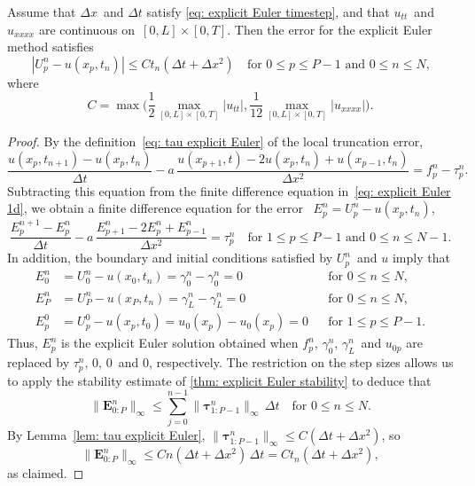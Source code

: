 \begin{theorem}\label{thm: explicit Euler error}
Assume that $\Delta x$~and $\Delta t$ satisfy 
\eqref{eq: explicit Euler timestep}, and that $u_{tt}$~and $u_{xxxx}$ are 
continuous on~$[0,L]\times[0,T]$. Then the error for the explicit Euler method 
satisfies
\[
|U^n_p-u(x_p,t_n)|\le Ct_n(\Delta t+\Delta x^2)
\quad\text{for $0\le p\le P-1$ and $0\le n\le N$,}
\]
where
\begin{equation}\label{eq: error const explicit Euler}
C=\max\biggl(\frac{1}{2}\max_{[0,L]\times[0,T]}|u_{tt}|,
	\frac{1}{12}\max_{[0,L]\times[0,T]}|u_{xxxx}|\biggr).
\end{equation}
\end{theorem}
\begin{proof}
By the definition~\eqref{eq: tau explicit Euler} of the local truncation error,
\[
\frac{u(x_p,t_{n+1})-u(x_p,t_n)}{\Delta t}
	-a\,\frac{u(x_{p+1},t)-2u(x_p,t_n)+u(x_{p-1},t_n)}{\Delta x^2}
	=f^n_p-\tau^n_p.
\]
Subtracting this equation from the finite difference equation 
in~\eqref{eq: explicit Euler 1d}, we obtain a finite difference equation for
the error ~$E^n_p=U^n_p-u(x_p,t_n)$,
\[
\frac{E^{n+1}_p-E^n_p}{\Delta t}
	-a\,\frac{E^n_{p+1}-2E^n_p+E^n_{p-1}}{\Delta x^2}=\tau^n_p
\quad\text{for $1\le p\le P-1$ and $0\le n\le N-1$.}
\]
In addition, the boundary and initial conditions satisfied by $U^n_p$~and $u$ 
imply that
\[
\begin{aligned}
E^n_0&=U^n_0-u(x_0,t_n)=\gamma_0^n-\gamma_0^n=0&&\text{for $0\le n\le N$,}\\
E^n_P&=U^n_P-u(x_P,t_n)=\gamma_L^n-\gamma_L^n=0&&\text{for $0\le n\le N$,}\\
E^0_p&=U^0_p-u(x_p,t_0)=u_0(x_p)-u_0(x_p)=0&&\text{for $1\le p\le P-1$.}
\end{aligned}
\]
Thus, $E^n_p$ is the explicit Euler solution obtained when $f^n_p$, 
$\gamma_0^n$, $\gamma_L^n$~and $u_{0p}$ are replaced by $\tau^n_p$, $0$, 
$0$~and $0$, respectively.  The restriction on the step sizes allows us to apply 
the stability estimate of \cref{thm: explicit Euler stability} to deduce 
that
\[
\|\boldsymbol{E}^n_{0:P}\|_\infty
	\le\sum_{j=0}^{n-1}\|\boldsymbol{\tau}^n_{1:P-1}\|_\infty\,\Delta t
	\quad\text{for $0\le n\le N$.}
\]
By Lemma~\ref{lem: tau explicit Euler}, 
$\|\boldsymbol{\tau}^n_{1:P-1}\|_\infty\le C(\Delta t+\Delta x^2)$, so
\[
\|\boldsymbol{E}^n_{0:P}\|_\infty\le Cn(\Delta t+\Delta x^2)\,\Delta t
	=Ct_n(\Delta t+\Delta x^2),
\]
as claimed.
\end{proof}

